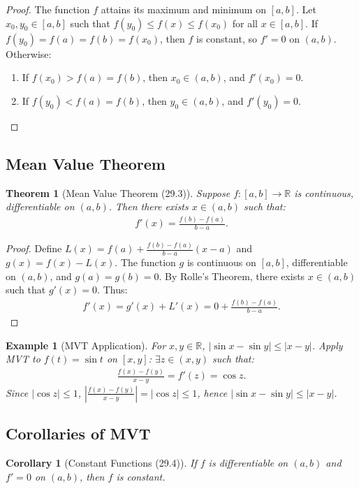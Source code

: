 \documentclass[9pt]{article}
\theoremstyle{definition}
\theoremstyle{plain}
\newtheorem{theorem}{Theorem}
\newtheorem{example}{Example}
\newtheorem{corollary}{Corollary}
\begin{document}
\begin{proof}
The function $ f $ attains its maximum and minimum on $ [a, b] $. Let $ x_0, y_0 \in [a, b] $ such that $ f(y_0) \leq f(x) \leq f(x_0) $ for all $ x \in [a, b] $. If $ f(y_0) = f(a) = f(b) = f(x_0) $, then $ f $ is constant, so $ f' = 0 $ on $ (a, b) $. Otherwise:
\begin{enumerate}
    \item If $ f(x_0) > f(a) = f(b) $, then $ x_0 \in (a, b) $, and $ f'(x_0) = 0 $.
    \item If $ f(y_0) < f(a) = f(b) $, then $ y_0 \in (a, b) $, and $ f'(y_0) = 0 $.
\end{enumerate}
\end{proof}

\subsection*{Mean Value Theorem}
\begin{theorem}[Mean Value Theorem (29.3)]
Suppose $ f : [a, b] \to \mathbb{R} $ is continuous, differentiable on $ (a, b) $. Then there exists $ x \in (a, b) $ such that:
\begin{align}
f'(x) = \frac{f(b) - f(a)}{b - a}.
\end{align}
\end{theorem}

\begin{proof}
Define $ L(x) = f(a) + \frac{f(b) - f(a)}{b - a}(x - a) $ and $ g(x) = f(x) - L(x) $. The function $ g $ is continuous on $ [a, b] $, differentiable on $ (a, b) $, and $ g(a) = g(b) = 0 $. By Rolle’s Theorem, there exists $ x \in (a, b) $ such that $ g'(x) = 0 $. Thus:
\begin{align}
f'(x) = g'(x) + L'(x) = 0 + \frac{f(b) - f(a)}{b - a}.
\end{align}
\end{proof}

\begin{example}[MVT Application]
For $ x, y \in \mathbb{R} $, $ |\sin x - \sin y| \leq |x - y| $. Apply MVT to $ f(t) = \sin t $ on $ [x, y] $: $ \exists z \in (x, y) $ such that:
\begin{align}
\frac{f(x) - f(y)}{x - y} = f'(z) = \cos z.
\end{align}
Since $ |\cos z| \leq 1 $, $ \left| \frac{f(x) - f(y)}{x - y} \right| = |\cos z| \leq 1 $, hence $ |\sin x - \sin y| \leq |x - y| $.
\end{example}

\subsection*{Corollaries of MVT}
\begin{corollary}[Constant Functions (29.4)]
If $ f $ is differentiable on $ (a, b) $ and $ f' = 0 $ on $ (a, b) $, then $ f $ is constant.
\end{corollary}
\end{document}
